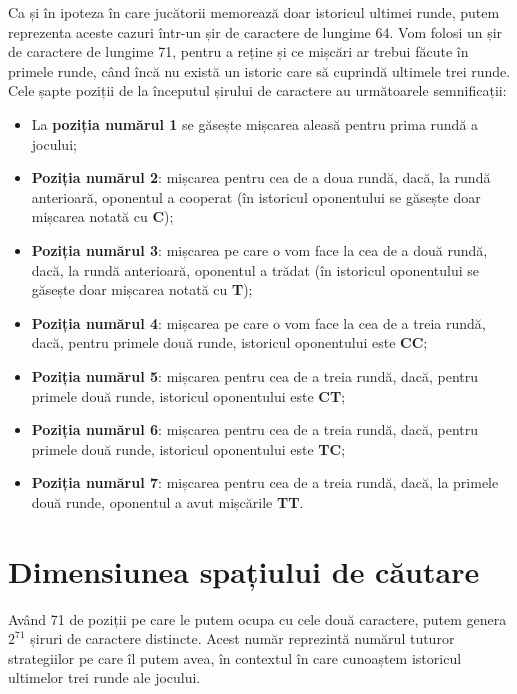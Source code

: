 Ca și în  ipoteza în care jucătorii memorează doar istoricul ultimei runde, putem reprezenta aceste cazuri într-un șir de caractere de lungime 64. Vom folosi un șir de caractere de lungime 71, pentru a reține și ce mișcări ar trebui făcute în primele runde, când încă nu există un istoric care să cuprindă ultimele trei runde. Cele șapte poziții de la începutul șirului de caractere au următoarele semnificații:
\begin{itemize}
	
	\item La \textbf{poziția numărul 1} se găsește mișcarea aleasă pentru prima rundă a jocului;
	
	\item \textbf{Poziția numărul 2}: mișcarea pentru cea de a doua rundă, dacă, la rundă anterioară, oponentul a cooperat (în istoricul oponentului se găsește doar mișcarea notată cu 
	\textbf{C});
	
	\item \textbf{Poziția numărul 3}: mișcarea pe care o vom face la cea de a două rundă, dacă, la rundă anterioară, oponentul a trădat (în istoricul oponentului se găsește doar mișcarea notată cu \textbf{T});
	
	\item \textbf{Poziția numărul 4}: mișcarea pe care o vom face la cea de a treia rundă, dacă, pentru primele două runde, istoricul oponentului este \textbf{CC};
	
	\item \textbf{Poziția numărul 5}: mișcarea pentru cea de a treia rundă, dacă, pentru primele două runde, istoricul oponentului este \textbf{CT};
	
	\item \textbf{Poziția numărul 6}: mișcarea pentru cea de a treia rundă, dacă, pentru primele două runde, istoricul oponentului este \textbf{TC};
	
	\item \textbf{Poziția numărul 7}: mișcarea pentru cea de a treia rundă, dacă, la primele două runde, oponentul a avut mișcările \textbf{TT}.
	
\end{itemize}

\section{Dimensiunea spațiului de căutare}

Având 71 de poziții pe care le putem ocupa cu cele două caractere, putem genera $2^{71}$ șiruri de caractere distincte. Acest număr reprezintă numărul tuturor strategiilor pe care îl putem avea, în contextul în care cunoaștem istoricul ultimelor trei runde ale jocului.  

